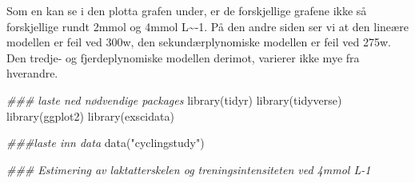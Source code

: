 \documentclass[
  letterpaper,
  DIV=11,
  numbers=noendperiod]{scrartcl}
\newenvironment{Shaded}{\begin{snugshade}}{\end{snugshade}}
\newcommand{\DocumentationTok}[1]{\textcolor[rgb]{0.37,0.37,0.37}{\textit{#1}}}
\newcommand{\FunctionTok}[1]{\textcolor[rgb]{0.28,0.35,0.67}{#1}}
\newcommand{\NormalTok}[1]{\textcolor[rgb]{0.00,0.23,0.31}{#1}}
\newcommand{\StringTok}[1]{\textcolor[rgb]{0.13,0.47,0.30}{#1}}
\begin{document}
Som en kan se i den plotta grafen under, er de forskjellige grafene ikke
så forskjellige rundt 2mmol og 4mmol L\textasciitilde-1. På den andre
siden ser vi at den lineære modellen er feil ved 300w, den
sekundærplynomiske modellen er feil ved 275w. Den tredje- og
fjerdeplynomiske modellen derimot, varierer ikke mye fra hverandre.

\begin{Shaded}
\begin{Highlighting}[]
\DocumentationTok{\#\#\# laste ned nødvendige packages}
\FunctionTok{library}\NormalTok{(tidyr)}
\FunctionTok{library}\NormalTok{(tidyverse)}
\FunctionTok{library}\NormalTok{(ggplot2)}
\FunctionTok{library}\NormalTok{(exscidata)}


\DocumentationTok{\#\#\#laste inn data}
\FunctionTok{data}\NormalTok{(}\StringTok{"cyclingstudy"}\NormalTok{)}


\DocumentationTok{\#\#\# Estimering av laktatterskelen og treningsintensiteten ved 4mmol L{-}1 }


\end{Highlighting}
\end{Shaded}
\end{document}
